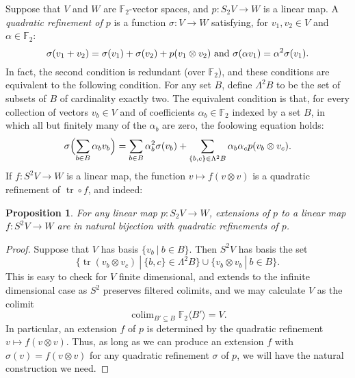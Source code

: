 \documentclass[11pt]{amsart} \renewcommand{\baselinestretch}{1.2}
\theoremstyle{plain}
\newtheorem{prop}[thm]{Proposition}
\numberwithin{equation}{section} %
\theoremstyle{plain}
\newtheorem{prop}[thm]{Proposition}
\numberwithin{equation}{chapter} %
\DeclareMathOperator{\trace}{tr}
\DeclareMathOperator*{\colim}{colim}
\renewcommand{\to}{\longrightarrow}
\newcommand{\F}{\mathbb{F}}
\newcommand{\Ftwo}{\F_2}
\renewcommand{\mapsto}{\longmapsto}
\begin{document}
\begin{Conventions and notation}
Suppose that $V$ and $W$ are $\Ftwo $-vector spaces, and $p:S_2V\to W$ is a linear map. A \emph{quadratic refinement of $p$} is a function $\sigma:V\to W$ satisfying, for $v_1,v_2\in V$ and $\alpha\in\Ftwo $:
\[\sigma(v_1+v_2)=\sigma(v_1)+\sigma(v_2)+p(v_1\otimes v_2)\textup{ and }\sigma(\alpha v_1)=\alpha^2\sigma(v_1).\]
In fact, the second condition is redundant (over $\Ftwo $), and these conditions are equivalent to the following condition. For any set $B$, define $\Lambda^2B$ to be the set of subsets of $B$ of cardinality exactly two. 
The equivalent condition is that, for every collection of vectors $v_b\in V$ and of coefficients $\alpha_b\in \Ftwo $ indexed by a set $B$, in which all but finitely many of the $\alpha_b$ are zero, the foolowing equation holds:
\[\sigma\Bigl(\sum_{b\in B}\alpha_bv_b\Bigr)=\sum_{b\in B}\alpha_b^2\sigma(v_b)+\sum_{\{b,c\}\in \Lambda^2B}\alpha_b\alpha_cp(v_b\otimes v_c).\]
%
%
%
%
%
If $f:S^2V\to W$ is a linear map, the function
$v\mapsto f(v\otimes v)$
is a quadratic refinement of $\trace\circ f$, and indeed:
\begin{prop}
\label{propOnExtendingToInvariants}
For any linear map $p:S_2V\to W$, extensions of $p$ to a linear map $f:S^2V\to W$ are in natural bijection  with quadratic refinements of $p$.
\end{prop}
\begin{proof}
Suppose that $V$ has basis $\{v_b\ |\ b\in B\}$. Then $S^2V$ has basis the set 
\[\{\trace(v_b\otimes v_c)\ |\ \{b,c\}\in\Lambda^2B\}\cup\{v_b\otimes v_b\ |\ b\in B\}.\]
This is easy to check for $V$ finite dimensional, and extends to the infinite dimensional case as $S^2$ preserves filtered colimits, and we may calculate $V$ as the colimit
\[\colim_{B'\subseteq B}\Ftwo \langle B'\rangle=V.\]
In particular, an extension $f$ of $p$ is determined by the quadratic refinement $v\mapsto f(v\otimes v)$. Thus, as long as we can produce an extension $f$ with $\sigma(v)=f(v\otimes v)$ for any quadratic refinement $\sigma$ of $p$, we will have the natural construction we need.


\end{proof}
\end{Conventions and notation}
\end{document}
